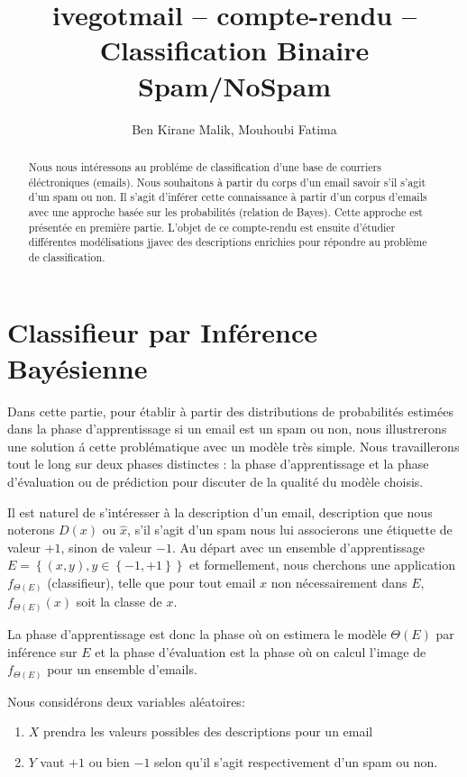 \documentclass[a4paper, french]{article}
\title{ivegotmail -- compte-rendu --\\ Classification Binaire Spam/NoSpam}
\author{Ben Kirane Malik, Mouhoubi Fatima}
\begin{document}
\maketitle
\setlength{\parskip}{0.1in}
\setlength{\parindent}{15pt}

\begin{abstract}
Nous nous int\'eressons au probl\'eme de classification d'une base de courriers
\'el\'ectroniques (emails).
Nous souhaitons \`a partir du corps d'un email savoir s'il s'agit
d'un spam ou non. Il s'agit d'inf\'erer cette connaissance \`a partir
d'un corpus d'emails avec une approche bas\'ee sur les probabilit\'es
(relation de Bayes). Cette approche est  pr\'esent\'ee en premi\`ere partie.
L'objet de ce compte-rendu est ensuite d'\'etudier diff\'erentes mod\'elisations
jjavec des descriptions enrichies pour r\'epondre au probl\`eme de classification.
\end{abstract}

\tableofcontents

\section{Classifieur par Inf\'erence Bay\'esienne}
Dans cette partie, pour \'etablir  \`a partir des distributions de
probabilit\'es estim\'ees dans la phase d'apprentissage si un email est
un spam ou non, nous illustrerons une solution \'a cette probl\'ematique
avec un mod\`ele tr\`es simple.
Nous travaillerons tout le long sur deux phases distinctes :
la phase d'apprentissage et la phase d'\'evaluation ou de pr\'ediction pour
discuter de la qualit\'e du mod\`ele choisis.

Il est naturel de s'int\'eresser \`a la description d'un email, description que
nous noterons $D(x)$ ou $\hat{x}$, s'il s'agit d'un spam nous lui associerons
une \'etiquette de valeur $+1$, sinon de valeur $-1$.
Au d\'epart avec un ensemble d'apprentissage
$E=\left\{(x,y), y\in \left\{-1,+1\right\}\right\}$ et formellement,
nous cherchons une application $f_{\Theta(E)}$  (classifieur),
telle que pour tout email $x$ non n\'ecessairement dans $E$, $f_{\Theta(E)}(x)$
soit la classe de $x$.

La phase d'apprentissage est donc la phase o\`u on estimera le mod\`ele
$\Theta(E)$ par inf\'erence sur $E$ et la phase d'\'evaluation est la phase
o\`u on calcul l'image de $f_{\Theta(E)}$ pour un ensemble d'emails.

Nous consid\'erons deux variables al\'eatoires:
\begin{enumerate}
\item $X$ prendra les valeurs possibles des descriptions pour un email
\item $Y$ vaut $+1$ ou bien $-1$ selon qu'il s'agit respectivement
d'un spam ou non.
\end{enumerate}
\end{document}
